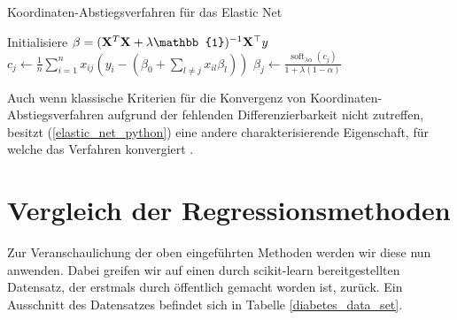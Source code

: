 \begin{algorithm}[tbh]
    \caption{Koordinaten-Abstiegsverfahren für das Elastic Net}
    \label{enet_algorithm}
    \begin{algorithmic}[1]
        	\State Initialisiere $\beta = (\mat X^T\mat X + \lambda\mat{\mathbb{1}})^{-1}\mat X^{\top}y$
                	\State $c_j \gets \frac{1}{n}\sum_{i=1}^n x_{ij}(y_i - (\beta_0 + \sum_{l \neq j} x_{il}\beta_l))$
                	\State $\beta_j \gets \frac{\operatorname{soft}_{\lambda\alpha}(c_j)}{1 + \lambda (1-\alpha)}$
        		\EndFor
        	\EndWhile
        \EndProcedure
    \end{algorithmic}
\end{algorithm} 

Auch wenn klassische Kriterien für die Konvergenz von Koordinaten-Abstiegsverfahren aufgrund der fehlenden Differenzierbarkeit nicht zutreffen, besitzt (\ref{elastic_net_python}) eine andere charakterisierende Eigenschaft, für welche das Verfahren konvergiert \cite{tseng}.




\section{Vergleich der Regressionsmethoden}
\label{comparison_linear_models}

Zur Veranschaulichung der oben eingeführten Methoden werden wir diese nun anwenden. Dabei greifen wir auf einen durch scikit-learn \cite{scikit_learn} bereitgestellten Datensatz, der erstmals durch \cite{efron_lars} öffentlich gemacht worden ist, zurück. Ein Ausschnitt des Datensatzes befindet sich in Tabelle \ref{diabetes_data_set}.

